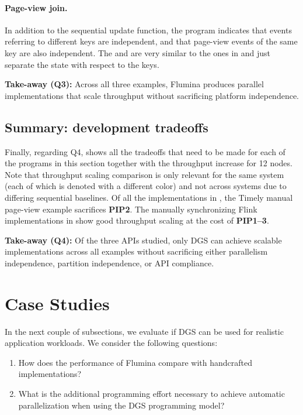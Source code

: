 \paragraph{Page-view join.}
In addition to the sequential update function, the program indicates that events referring to different keys are independent, and that page-view events of the same key are also independent. The  and  are very similar to the ones in  and just separate the state with respect to the keys.

\begin{takeaway}
\textbf{Take-away (Q3):}
Across all three examples,
Flumina produces parallel implementations that scale throughput without sacrificing platform independence.
\end{takeaway}

\subsection{Summary: development tradeoffs}
\label{dgs:ssec:eval-development-tradeoffs}

Finally, regarding Q4,
 shows all the tradeoffs that need to be made for each of the programs in this section together with the throughput increase for 12 nodes.
Note that throughput scaling comparison is only relevant for the same system (each of which is denoted with a different color) and not across systems due to differing sequential baselines.
Of all the implementations in , the Timely manual page-view example sacrifices \textbf{PIP2}.
The manually synchronizing Flink implementations in  show good throughput scaling at the cost of \textbf{PIP1--3}.

\begin{takeaway}
\textbf{Take-away (Q4):}
Of the three APIs studied,
only DGS can achieve scalable implementations across
all examples without sacrificing either parallelism independence, partition independence, or API compliance.
\end{takeaway}


\section{Case Studies}
\label{dgs:appendix:case-studies}

In the next couple of subsections, we evaluate if DGS can be used for realistic application workloads.
We consider the following questions:
\begin{enumerate}
    \item How does the performance of Flumina compare with handcrafted implementations?
    \item What is the additional programming effort necessary to achieve automatic parallelization when using the DGS programming model?
\end{enumerate}

